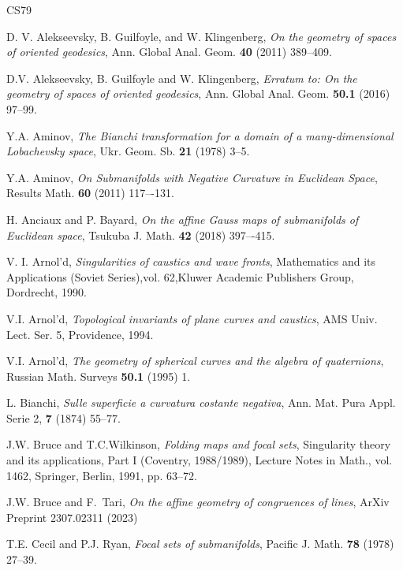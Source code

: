 \documentclass[12pt]{amsart}
\theoremstyle{plain}
\theoremstyle{definition}
\numberwithin{equation}{section}
\begin{document}
\begin{thebibliography}{CS79}


D. V. Alekseevsky, B. Guilfoyle, and W. Klingenberg, {\it On the geometry of spaces of oriented geodesics}, Ann. Global Anal. Geom. {\bf 40} (2011) 389--409. 

D.V. Alekseevsky, B. Guilfoyle and W. Klingenberg, {\it Erratum to: On the geometry of spaces of oriented geodesics}, Ann. Global Anal. Geom. {\bf 50.1} (2016) 97--99.  

Y.A. Aminov, {\it The Bianchi transformation for a domain of a many-dimensional Lobachevsky space}, Ukr. Geom. Sb. \textbf{21} (1978) 3--5.

Y.A. Aminov, {\it On Submanifolds with Negative Curvature in Euclidean Space}, Results Math. \textbf{60} (2011) 117–-131.

H. Anciaux and P. Bayard, \textit{On the affine Gauss maps of submanifolds of Euclidean space}, Tsukuba J. Math. \textbf{42} (2018) 397–-415.

V. I. Arnol’d, \textit{Singularities of caustics and wave fronts}, Mathematics and its Applications (Soviet Series),vol. 62,Kluwer Academic Publishers Group, Dordrecht, 1990.

V.I. Arnol'd, {\it Topological invariants of plane curves and caustics}, AMS Univ. Lect. Ser. 5, Providence, 1994.

V.I. Arnol'd, {\it The geometry of spherical curves and the algebra of quaternions}, Russian Math. Surveys {\bf 50.1} (1995) 1.

L. Bianchi, \emph{Sulle superficie a curvatura costante negativa}, Ann. Mat. Pura Appl. Serie 2, \textbf{7} (1874) 55--77.

J.W. Bruce and T.C.Wilkinson, \textit{Folding maps and focal sets}, Singularity theory and its applications,
Part I (Coventry, 1988/1989), Lecture Notes in Math., vol. 1462, Springer, Berlin, 1991, pp. 63–72.

J.W. Bruce and F.~Tari, \textit{On the affine geometry of congruences of lines}, ArXiv Preprint 2307.02311 (2023)

T.E. Cecil and P.J. Ryan,
\textit{Focal sets of submanifolds}, Pacific J. Math. {\bf 78} (1978) 27--39.


\end{thebibliography}
\end{document}
